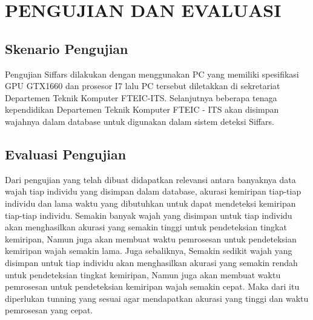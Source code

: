 \chapter{PENGUJIAN DAN EVALUASI}


\section{Skenario Pengujian}

Pengujian Siffars dilakukan dengan menggunakan PC yang memiliki spesifikasi GPU GTX1660 dan prosesor I7 lalu PC
tersebut diletakkan di sekretariat Departemen Teknik Komputer FTEIC-ITS. Selanjutnya beberapa tenaga kependidikan
Departemen Teknik Komputer FTEIC - ITS akan disimpan wajahnya dalam database untuk digunakan dalam sistem deteksi Siffars.

\section{Evaluasi Pengujian}

Dari pengujian yang telah dibuat didapatkan relevansi antara banyaknya data wajah tiap individu yang disimpan dalam database,
akurasi kemiripan tiap-tiap individu dan lama waktu yang dibutuhkan untuk dapat mendeteksi kemiripan tiap-tiap individu.
Semakin banyak wajah yang disimpan untuk tiap individu akan menghasilkan akurasi yang semakin tinggi untuk pendeteksian tingkat kemiripan,
Namun juga akan membuat waktu pemrosesan untuk pendeteksian kemiripan wajah semakin lama. Juga sebaliknya,
Semakin sedikit wajah yang disimpan untuk tiap individu akan menghasilkan akurasi yang semakin rendah untuk pendeteksian tingkat kemiripan,
Namun juga akan membuat waktu pemrosesan untuk pendeteksian kemiripan wajah semakin cepat. Maka dari itu diperlukan
tunning yang sesuai agar mendapatkan akurasi yang tinggi dan waktu pemrosesan yang cepat.

% 

